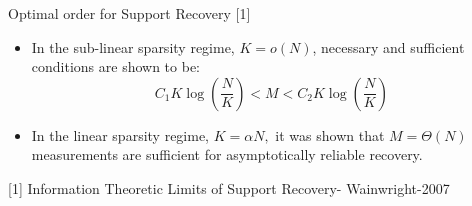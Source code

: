 \begin{frame}
\begin{block}{Optimal order for Support Recovery [1]}
\begin{itemize}
\item In the sub-linear sparsity regime, $K=o(N)$, necessary and sufficient conditions are shown to be:
\begin{equation*}
C_1 K\log\left(\frac{N}{K}\right)<M<C_2 K\log\left(\frac{N}{K}\right)
\end{equation*}
\item In the linear sparsity regime, $K=\alpha N,$ it was shown that $M=\Theta(N)$ measurements are sufficient for asymptotically reliable recovery. 
 \end{itemize}
\end{block}
\vspace{7ex}


[1] Information Theoretic Limits of Support Recovery- Wainwright-2007
\end{frame}

